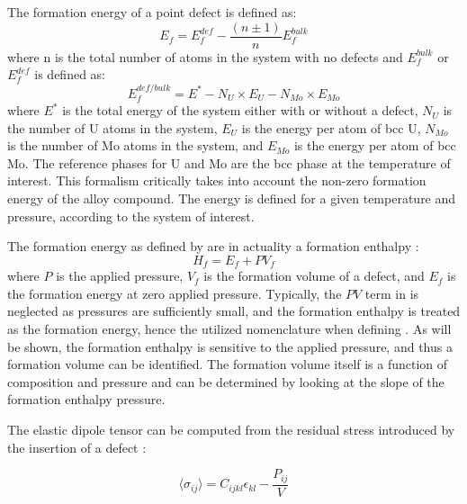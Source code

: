 \documentclass[review]{elsarticle}
\providecommand{\DIFadd}[1]{{\sf #1}} %
\providecommand{\DIFdel}[1]{{[..\footnote{removed: #1} ]}} %
\providecommand{\DIFaddbegin}{\protect\color{blue}} %
\providecommand{\DIFaddend}{\protect\color{black}} %
\providecommand{\DIFdelbegin}{\protect\color{red}} %
\providecommand{\DIFdelend}{\protect\color{black}} %
\newcommand{\DIFscaledelfig}{0.5}
\newlength{\DIFdelgraphicswidth} %
\newlength{\DIFdelgraphicsheight} %
\newcommand{\DIFaddincludegraphics}[2][]{{\color{blue}\fbox{\DIFOincludegraphics[#1]{#2}}}} %
\newcommand{\DIFdelincludegraphics}[2][]{%
\sbox{\DIFdelgraphicsbox}{\DIFOincludegraphics[#1]{#2}}%
\settoboxwidth{\DIFdelgraphicswidth}{\DIFdelgraphicsbox} %
\settoboxtotalheight{\DIFdelgraphicsheight}{\DIFdelgraphicsbox} %
\scalebox{\DIFscaledelfig}{%
\parbox[b]{\DIFdelgraphicswidth}{\usebox{\DIFdelgraphicsbox}\\[-\baselineskip] \rule{\DIFdelgraphicswidth}{0em}}\llap{\resizebox{\DIFdelgraphicswidth}{\DIFdelgraphicsheight}{%
\setlength{\unitlength}{\DIFdelgraphicswidth}%
\begin{picture}(1,1)%
\thicklines\linethickness{2pt} %
{\color[rgb]{1,0,0}\put(0,0){\framebox(1,1){}}}%
{\color[rgb]{1,0,0}\put(0,0){\line( 1,1){1}}}%
{\color[rgb]{1,0,0}\put(0,1){\line(1,-1){1}}}%
\end{picture}%
}\hspace*{3pt}}} %
} %
\DeclareRobustCommand{\DIFaddbegin}{\DIFOaddbegin \let\includegraphics\DIFaddincludegraphics} %
\DeclareRobustCommand{\DIFaddend}{\DIFOaddend \let\includegraphics\DIFOincludegraphics} %
\DeclareRobustCommand{\DIFdelbegin}{\DIFOdelbegin \let\includegraphics\DIFdelincludegraphics} %
\DeclareRobustCommand{\DIFdelend}{\DIFOaddend \let\includegraphics\DIFOincludegraphics} %
\begin{document}
\DIFaddend The formation energy of a point defect is defined as:
\begin{equation}\label{eq:eform1}
 E_f = E_f^{def} - \frac{(n\pm1)}{n}E_f^{bulk}
\end{equation}
\noindent where n is the total number of atoms in the system with no defects and $E_f^{bulk}$ or $E_f^{def}$ is defined as:
\begin{equation}\label{eq:eform2}
E_f^{def/bulk} = E^* - N_U \times E_U - N_{Mo} \times E_{Mo}
\end{equation}
\noindent where $E^*$ is the total energy of the system either with or without a defect, $N_U$ is the number of U atoms in the system, $E_U$ is the energy per atom of bcc U, $N_{Mo}$ is the number of Mo atoms in the system, and $E_{Mo}$ is the energy per atom of bcc Mo. The reference phases for U and Mo are the bcc phase at the temperature of interest. This formalism critically takes into account the non-zero formation energy of the alloy compound. The energy is defined for a given temperature and pressure, according to the system of interest. 

The formation energy as defined by  are in actuality a formation enthalpy \cite{kraftmakher1998}:
\begin{equation}\label{eq:enthalpy}
 H_f = E_f + PV_f 
\end{equation}
\noindent where $P$ is the applied pressure, $V_f$ is the formation volume of a defect, and $E_f$ is the formation energy at zero applied pressure. Typically, the $PV$ term in  is neglected as pressures are sufficiently small, and the formation enthalpy is treated as the formation energy, hence the utilized nomenclature when defining . As will be shown, the formation enthalpy is sensitive to the applied pressure, and thus a formation volume can be identified. The formation volume itself is a function of composition and pressure and can be determined by looking at the slope of the formation enthalpy \DIFdelbegin \DIFdel{as a function of }\DIFdelend \DIFaddbegin \DIFadd{(E+PV) with respect to }\DIFaddend pressure. 

The elastic dipole tensor can be computed from the residual stress introduced by the insertion of a defect \cite{varvenne2017}:

\begin{equation}\label{eq:dipole1}
    \langle \sigma_{ij} \rangle = C_{ijkl}\epsilon_{kl} - \frac{P_{ij}}{V}
\end{equation}
\end{document}
